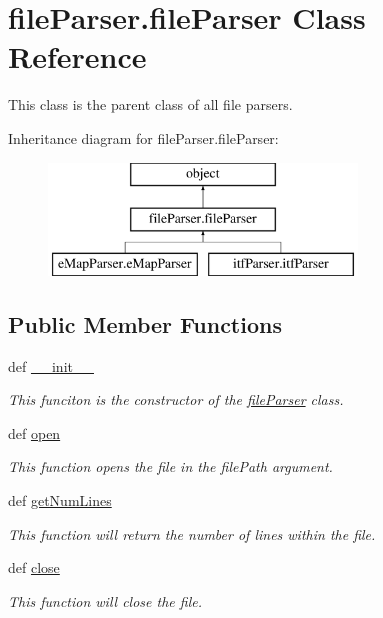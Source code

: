 \hypertarget{classfile_parser_1_1file_parser}{\section{file\-Parser.\-file\-Parser Class Reference}
\label{classfile_parser_1_1file_parser}
}


This class is the parent class of all file parsers.  


Inheritance diagram for file\-Parser.\-file\-Parser\-:\begin{figure}[H]
\begin{center}
\leavevmode
\includegraphics[height=3.000000cm]{classfile_parser_1_1file_parser}
\end{center}
\end{figure}
\subsection*{Public Member Functions}
\begin{DoxyCompactItemize}
\item 
def \hyperlink{classfile_parser_1_1file_parser_a719b66d5fbb38b07112ac5770ee7227f}{\-\_\-\-\_\-init\-\_\-\-\_\-}
\begin{DoxyCompactList}\small\item\em This funciton is the constructor of the \hyperlink{classfile_parser_1_1file_parser}{file\-Parser} class. \end{DoxyCompactList}\item 
def \hyperlink{classfile_parser_1_1file_parser_ae60626fb0335d75b12a8dd80cc29db7e}{open}
\begin{DoxyCompactList}\small\item\em This function opens the file in the file\-Path argument. \end{DoxyCompactList}\item 
def \hyperlink{classfile_parser_1_1file_parser_a09b008848fe8dc2dcff9c59df98345d6}{get\-Num\-Lines}
\begin{DoxyCompactList}\small\item\em This function will return the number of lines within the file. \end{DoxyCompactList}\item 
def \hyperlink{classfile_parser_1_1file_parser_acbb2b6efa885326b69b165904ff2f8d2}{close}
\begin{DoxyCompactList}\small\item\em This function will close the file. \end{DoxyCompactList}\end{DoxyCompactItemize}
